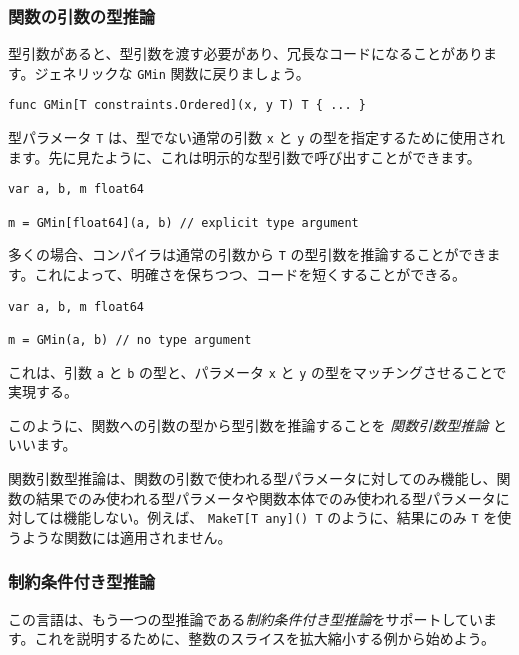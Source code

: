 \subsubsection{関数の引数の型推論}

型引数があると、型引数を渡す必要があり、冗長なコードになることがあります。ジェネリックな
\texttt{GMin} 関数に戻りましょう。

\begin{lstlisting}[numbers=none]
func GMin[T constraints.Ordered](x, y T) T { ... }
\end{lstlisting}

型パラメータ \texttt{T} は、型でない通常の引数 \texttt{x} と \texttt{y}
の型を指定するために使用されます。先に見たように、これは明示的な型引数で呼び出すことができます。

\begin{lstlisting}[numbers=none]
var a, b, m float64

m = GMin[float64](a, b) // explicit type argument
\end{lstlisting}

多くの場合、コンパイラは通常の引数から \texttt{T}
の型引数を推論することができます。これによって、明確さを保ちつつ、コードを短くすることができる。

\begin{lstlisting}[numbers=none]
var a, b, m float64

m = GMin(a, b) // no type argument
\end{lstlisting}

これは、引数 \texttt{a} と \texttt{b} の型と、パラメータ \texttt{x} と
\texttt{y} の型をマッチングさせることで実現する。

このように、関数への引数の型から型引数を推論することを
\emph{関数引数型推論} といいます。

関数引数型推論は、関数の引数で使われる型パラメータに対してのみ機能し、関数の結果でのみ使われる型パラメータや関数本体でのみ使われる型パラメータに対しては機能しない。例えば、
\texttt{MakeT{[}T\ any{]}()\ T} のように、結果にのみ \texttt{T}
を使うような関数には適用されません。

\subsubsection{制約条件付き型推論}

この言語は、もう一つの型推論である\emph{制約条件付き型推論}をサポートしています。これを説明するために、整数のスライスを拡大縮小する例から始めよう。

